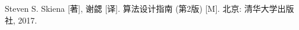 
\begin{thebibliography}{0}


Steven S. Skiena [著], 谢勰 [译]. 算法设计指南 (第2版) [M]. 北京: 清华大学出版社, 2017.

\end{thebibliography}

